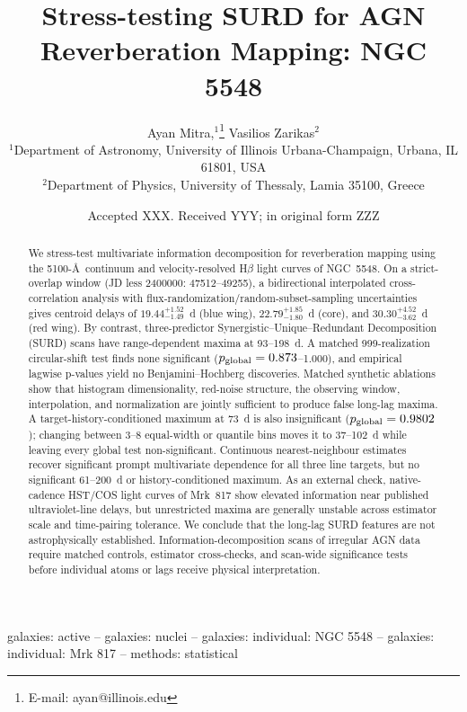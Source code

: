 \documentclass[fleqn,usenatbib]{mnras}
\title[Stress-testing SURD in NGC 5548]{Stress-testing SURD for AGN Reverberation Mapping: NGC 5548}
\author[A. Mitra \& V. Zarikas]{
Ayan Mitra,$^{1}$\thanks{E-mail: ayan@illinois.edu}
Vasilios Zarikas$^{2}$
\\
$^{1}$Department of Astronomy, University of Illinois Urbana-Champaign, Urbana, IL 61801, USA\\
$^{2}$Department of Physics, University of Thessaly, Lamia 35100, Greece
}
\date{Accepted XXX. Received YYY; in original form ZZZ}
\begin{document}
\label{firstpage}
\pagerange{\pageref{firstpage}--\pageref{LastPage}}
\maketitle

\begin{abstract}
We stress-test multivariate information decomposition for reverberation mapping using the 5100-\AA\ continuum and velocity-resolved H$\beta$ light curves of NGC~5548. On a strict-overlap window (JD less 2400000: 47512--49255), a bidirectional interpolated cross-correlation analysis with flux-randomization/random-subset-sampling uncertainties gives centroid delays of $19.44^{+1.52}_{-1.49}$~d (blue wing), $22.79^{+1.85}_{-1.80}$~d (core), and $30.30^{+4.52}_{-3.62}$~d (red wing). By contrast, three-predictor Synergistic--Unique--Redundant Decomposition (SURD) scans have range-dependent maxima at 93--198~d. A matched 999-realization circular-shift test finds none significant ($p_{\rm global}=0.873$--1.000), and empirical lagwise p-values yield no Benjamini--Hochberg discoveries. Matched synthetic ablations show that histogram dimensionality, red-noise structure, the observing window, interpolation, and normalization are jointly sufficient to produce false long-lag maxima. A target-history-conditioned maximum at 73~d is also insignificant ($p_{\rm global}=0.9802$); changing between 3--8 equal-width or quantile bins moves it to 37--102~d while leaving every global test non-significant. Continuous nearest-neighbour estimates recover significant prompt multivariate dependence for all three line targets, but no significant 61--200~d or history-conditioned maximum. As an external check, native-cadence HST/COS light curves of Mrk~817 show elevated information near published ultraviolet-line delays, but unrestricted maxima are generally unstable across estimator scale and time-pairing tolerance. We conclude that the long-lag SURD features are not astrophysically established. Information-decomposition scans of irregular AGN data require matched controls, estimator cross-checks, and scan-wide significance tests before individual atoms or lags receive physical interpretation.
\end{abstract}
\begin{keywords}
galaxies: active -- galaxies: nuclei -- galaxies: individual: NGC 5548 -- galaxies: individual: Mrk 817 -- methods: statistical
\end{keywords}
\end{document}
